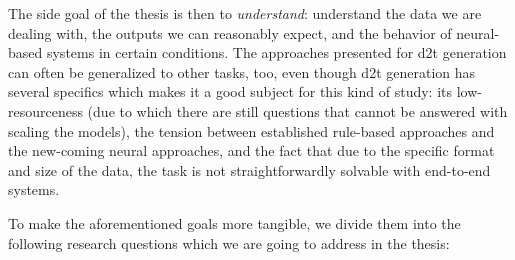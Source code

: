 The side goal of the thesis is then to \textit{understand}: understand the data we are dealing with, the outputs we can reasonably expect, and the behavior of neural-based systems in certain conditions. The approaches presented for \ac{d2t} generation can often be generalized to other tasks, too, even though \ac{d2t} generation has several specifics which makes it a good subject for this kind of study: its low-resourceness (due to which there are still questions that cannot be answered with scaling the models), the tension between established rule-based approaches and the new-coming neural approaches, and the fact that due to the specific format and size of the data, the task is not straightforwardly solvable with end-to-end systems.

To make the aforementioned goals more tangible, we divide them into the following research questions which we are going to address in the thesis:

